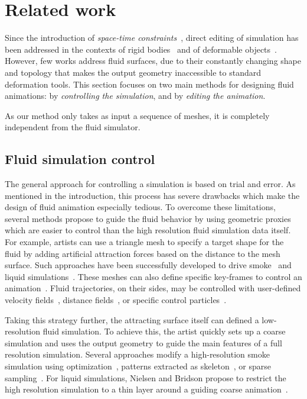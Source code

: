 \section{Related work}\label{sec:fluidsculpting:related_work}

Since the introduction of \emph{space-time constraints}~\cite{Witkin1988}, direct editing of simulation has been addressed in the contexts of rigid bodies~\cite{Popovic2000,Chenney2000,Twigg2007} and of deformable objects~\cite{wojtan2006keyframe,Barbic2009,Barbic2012,Schulz2014,Li2014}.
However, few works address fluid surfaces, due to their constantly changing shape and topology that makes the output geometry inaccessible to standard deformation tools.
This section focuses on two main methods for designing fluid animations: by \emph{controlling the simulation}, and by \emph{editing the animation}. 

As our method only takes as input a sequence of meshes, it is completely independent from the fluid simulator.

\subsection{Fluid simulation control}
The general approach for controlling a simulation is based on trial and error.
As mentioned in the introduction, this process has severe drawbacks which make the design of fluid animation especially tedious. 
To overcome these limitations, several methods propose to guide the fluid behavior by using geometric proxies which are easier to control than the high resolution fluid simulation data itself.
For example, artists can use a triangle mesh to specify a target shape for the fluid by adding artificial attraction forces based on the distance to the mesh surface.
Such approaches have been successfully developed to drive smoke~\cite{Fattal2004,Hong2004,Shi2005a} and liquid simulations~\cite{Shi2005b,Raveendran2012}. 
These meshes can also define specific key-frames to control an animation~\cite{Treuille2003,McNamara2004}.
Fluid trajectories, on their sides, may be controlled with user-defined velocity fields~\cite{Kim2006:SmokeControl}, distance fields~\cite{Yang2013}, or specific control particles~\cite{Thurey2006:FluidControl,Madill2013}. 

Taking this strategy further, the attracting surface itself can defined a low-resolution fluid simulation. 
To achieve this, the artist quickly sets up a coarse simulation and uses the output geometry to guide the main features of a full resolution simulation.
Several approaches modify a high-resolution smoke simulation using optimization~\cite{Nielsen2009,Nielsen2010}, patterns extracted as skeleton~\cite{Yuan2011}, or sparse sampling~\cite{Huang2013}.
For liquid simulations, Nielsen and Bridson propose to restrict the high resolution simulation to a thin layer around a guiding coarse animation~\cite{Nielsen2011}.

